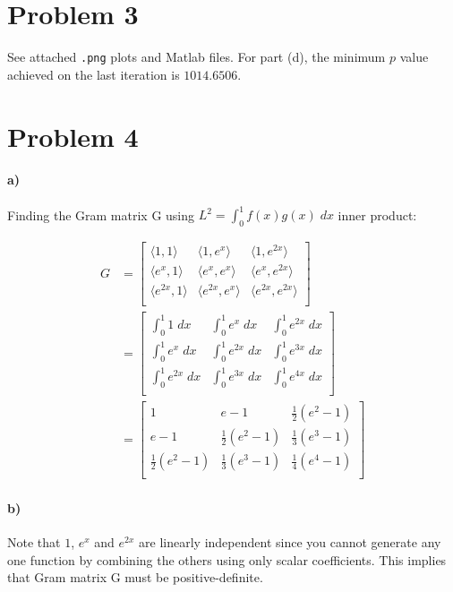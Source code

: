 \documentclass[10pt,letter]{article}
\newcommand{\inr}[2]{\langle #1, #2\rangle}
\begin{document}
\pagebreak

\section*{Problem 3}

See attached \texttt{.png} plots and Matlab files. For part (d), the minimum $p$ value achieved on the last iteration is $1014.6506$.

\section*{Problem 4}

\paragraph{a)} Finding the Gram matrix G using $L^2 = \int^1_0 f(x)g(x)\; dx$ inner product:

\begin{align*}
G &=
\left[ {\begin{array}{ccccc}
 \inr{1}{1} & \inr{1}{e^x} & \inr{1}{e^{2x}}  \\
 \inr{e^x}{1} & \inr{e^x}{e^x} & \inr{e^x}{e^{2x}}  \\
 \inr{e^{2x}}{1} & \inr{e^{2x}}{e^x} & \inr{e^{2x}}{e^{2x}}  \\
\end{array} } \right]
\\ &=
\left[ {\begin{array}{ccccc}
 \int^1_0 1\; dx & \int^1_0 e^x\; dx & \int^1_0 e^{2x}\; dx  \\
 \int^1_0 e^x\; dx & \int^1_0 e^{2x}\; dx & \int^1_0 e^{3x}\; dx  \\
 \int^1_0 e^{2x}\; dx & \int^1_0 e^{3x}\; dx & \int^1_0 e^{4x}\; dx  \\
\end{array} } \right]
\\ &=
\left[ {\begin{array}{ccccc}
 1 & e - 1 & \frac{1}{2}(e^2 - 1)  \\
 e - 1 & \frac{1}{2}(e^2 - 1) & \frac{1}{3}(e^3 - 1)  \\
 \frac{1}{2}(e^2 - 1) & \frac{1}{3}(e^3 - 1) & \frac{1}{4}(e^4 - 1)  \\
\end{array} } \right]
\end{align*}

\paragraph{b)} Note that $1$, $e^x$ and $e^{2x}$ are linearly independent since you cannot generate any one function by combining the others using only scalar coefficients. This implies that Gram matrix G must be positive-definite.
\end{document}

